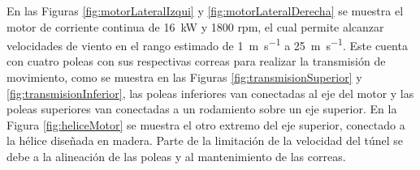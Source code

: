 En las Figuras \ref{fig:motorLateralIzqui} y \ref{fig:motorLateralDerecha} se muestra el motor de corriente continua de \SI{16}{\kilo\watt} y 1800 rpm, el cual permite alcanzar velocidades de viento en el rango estimado de \SI{1}{\meter\per\second} a \SI{25}{\meter\per\second}. Este cuenta con cuatro poleas con sus respectivas correas para realizar la transmisión de movimiento, como se muestra en las Figuras \ref{fig:transmisionSuperior} y \ref{fig:transmisionInferior}, las poleas inferiores van conectadas al eje del motor y las poleas superiores van conectadas a un rodamiento sobre un eje superior. En la Figura \ref{fig:heliceMotor} se muestra el otro extremo del eje superior, conectado a la hélice diseñada en madera. Parte de la limitación de la velocidad del túnel se debe a la alineación de las poleas y al mantenimiento de las correas.



